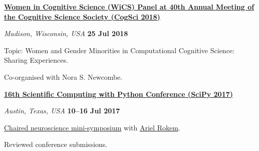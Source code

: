\documentclass[10pt]{article}
\newenvironment{outerlist}[1][\enskip\textbullet]%
        {\begin{itemize}[#1]}{\end{itemize}%
         \vspace{-.6\baselineskip}}
\newenvironment{innerlist}[1][\enskip\textbullet]%
        {\begin{compactitem}[#1]}{\end{compactitem}}
\begin{document}
\textbf{\href{http://womenincogsci.org/announcement/wics-workshop-cognitive-science-society-meeting-madison-wisconsin}{Women in Cognitive Science (WiCS) Panel at 40th Annual Meeting of the Cognitive Science Society (CogSci 2018)}}
\begin{outerlist}
  \item[] \textit{Madison, Wisconsin, USA} \hfill \textbf{25 Jul 2018}
  \begin{innerlist}
    \item Topic: Women and Gender Minorities in Computational Cognitive Science: Sharing Experiences.
    \item Co-organised with Nora S. Newcombe.
  \end{innerlist}
\end{outerlist}
\vspace{8pt}
\begin{samepage}

\textbf{\href{https://scipy2017.scipy.org}{16th Scientific Computing with Python Conference (SciPy 2017)}}
\begin{outerlist}
  \item[] \textit{Austin, Texas, USA} \hfill \textbf{10--16 Jul 2017}
  \begin{innerlist}
    \item \href{https://scipy2017.scipy.org/ehome/220975/493433/}{Chaired neuroscience mini-symposium} with \href{http://arokem.org/}{Ariel Rokem}.
    \item Reviewed conference submissions.
  \end{innerlist}
\end{outerlist}
\vspace{8pt}\end{samepage}
\end{document}
